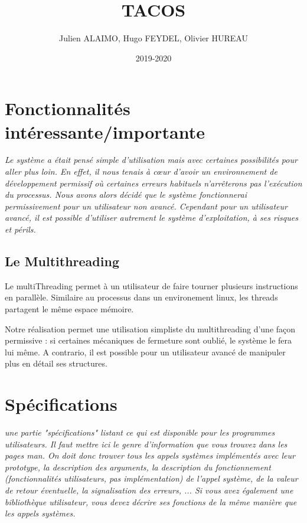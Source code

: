 \documentclass{article}
\title{TACOS}
\author{Julien ALAIMO, Hugo FEYDEL, Olivier HUREAU }
\date{2019-2020}
\begin{document}
\maketitle

\section{Fonctionnalités intéressante/importante}
\textit{
Le système a était pensé simple d'utilisation mais avec certaines possibilités pour aller plus loin. En effet, il nous tenais à cœur d'avoir un environnement de développement permissif où certaines erreurs habituels n'arrêterons pas l'exécution du processus. Nous avons alors décidé que le système fonctionnerai permissivement pour un utilisateur non avancé. Cependant pour un utilisateur avancé, il est possible d'utiliser autrement le système d'exploitation, à ses risques et périls.
}


\subsection{Le Multithreading}

Le multiThreading permet à un utilisateur de faire tourner plusieurs instructions en parallèle. Similaire au processus dans un environement linux, les threads partagent le même espace mémoire.

Notre réalisation permet une utilisation simpliste du multithreading d'une façon permissive : si certaines mécaniques de fermeture sont oublié, le système le fera lui même. A contrario, il est possible pour un utilisateur avancé de manipuler plus en détail ses structures.

\newpage
\section{Spécifications}

\textit{
une partie "spécifications" listant ce qui est disponible pour les programmes utilisateurs. Il faut mettre ici le genre d'information que vous trouvez dans les pages man. On doit donc trouver tous les appels systèmes implémentés avec leur prototype, la description des arguments, la description du fonctionnement (fonctionnalités utilisateurs, pas implémentation) de l'appel système, de la valeur de retour éventuelle, la signalisation des erreurs, ... Si vous avez également une bibliothèque utilisateur, vous devez décrire ses fonctions de la même manière que les appels systèmes.
}
\end{document}
